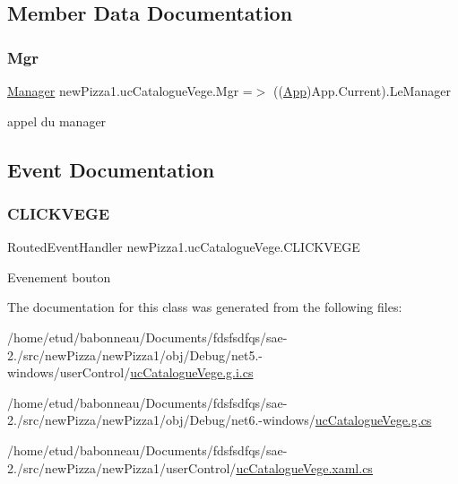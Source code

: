 \subsection{Member Data Documentation}
\mbox{\label{classnewPizza1_1_1ucCatalogueVege_ad21f5966af508301ef7618c6a53af352}} 
\subsubsection{\texorpdfstring{Mgr}{Mgr}}
{\footnotesize\ttfamily \hyperlink{classModele_1_1Manager}{Manager} new\+Pizza1.\+uc\+Catalogue\+Vege.\+Mgr =$>$ ((\hyperlink{classnewPizza1_1_1App}{App})App.\+Current).Le\+Manager}



appel du manager 



\subsection{Event Documentation}
\mbox{\label{classnewPizza1_1_1ucCatalogueVege_a83a034c219d0e1b01318e289900bebcc}} 
\subsubsection{\texorpdfstring{C\+L\+I\+C\+K\+V\+E\+GE}{CLICKVEGE}}
{\footnotesize\ttfamily Routed\+Event\+Handler new\+Pizza1.\+uc\+Catalogue\+Vege.\+C\+L\+I\+C\+K\+V\+E\+GE}



Evenement bouton 



The documentation for this class was generated from the following files\+:\begin{DoxyCompactItemize}
\item 
/home/etud/babonneau/\+Documents/fdsfsdfqs/sae-\/2./src/new\+Pizza/new\+Pizza1/obj/\+Debug/net5.-\/windows/user\+Control/\hyperlink{net5_80-windows_2userControl_2ucCatalogueVege_8g_8i_8cs}{uc\+Catalogue\+Vege.\+g.\+i.\+cs}\item 
/home/etud/babonneau/\+Documents/fdsfsdfqs/sae-\/2./src/new\+Pizza/new\+Pizza1/obj/\+Debug/net6.-\/windows/\hyperlink{Debug_2net6_80-windows_2ucCatalogueVege_8g_8cs}{uc\+Catalogue\+Vege.\+g.\+cs}\item 
/home/etud/babonneau/\+Documents/fdsfsdfqs/sae-\/2./src/new\+Pizza/new\+Pizza1/user\+Control/\hyperlink{ucCatalogueVege_8xaml_8cs}{uc\+Catalogue\+Vege.\+xaml.\+cs}\end{DoxyCompactItemize}
